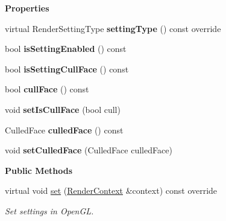 \begin{Indent}\textbf{ Properties}\par
\begin{DoxyCompactItemize}
\item 
\mbox{\label{classrev_1_1_cull_face_setting_ab539b7bb158303ac40a71138b18801f8}} 
virtual Render\+Setting\+Type {\bfseries setting\+Type} () const override
\item 
\mbox{\label{classrev_1_1_cull_face_setting_ad3fc9d89a02c4e3ed4be023e6e0a9bd4}} 
bool {\bfseries is\+Setting\+Enabled} () const
\item 
\mbox{\label{classrev_1_1_cull_face_setting_accf2ce6f2d01be5be15c4cb8fa9c08c4}} 
bool {\bfseries is\+Setting\+Cull\+Face} () const
\item 
\mbox{\label{classrev_1_1_cull_face_setting_ad9748bac70feb9ba628bb79ff4528b99}} 
bool {\bfseries cull\+Face} () const
\item 
\mbox{\label{classrev_1_1_cull_face_setting_a288c3474f2a54f306efc7133b736c558}} 
void {\bfseries set\+Is\+Cull\+Face} (bool cull)
\item 
\mbox{\label{classrev_1_1_cull_face_setting_ac6329a52d649edaace7360e8629536bc}} 
Culled\+Face {\bfseries culled\+Face} () const
\item 
\mbox{\label{classrev_1_1_cull_face_setting_aab54b801d0914408f97224aedc763d2c}} 
void {\bfseries set\+Culled\+Face} (Culled\+Face culled\+Face)
\end{DoxyCompactItemize}
\end{Indent}
\begin{Indent}\textbf{ Public Methods}\par
\begin{DoxyCompactItemize}
\item 
\mbox{\label{classrev_1_1_cull_face_setting_ae0bb0f3da7c25ad315c00f84affa46f7}} 
virtual void \mbox{\hyperlink{classrev_1_1_cull_face_setting_ae0bb0f3da7c25ad315c00f84affa46f7}{set}} (\mbox{\hyperlink{classrev_1_1_render_context}{Render\+Context}} \&context) const override
\begin{DoxyCompactList}\small\item\em Set settings in Open\+GL. \end{DoxyCompactList}\end{DoxyCompactItemize}
\end{Indent}
